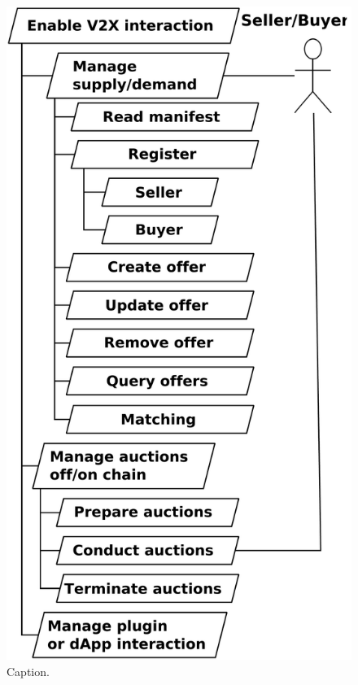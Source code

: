 \documentclass{llncs}
\begin{document}
{				\begin{figure}[H]
					\centering
					\includegraphics[scale=0.175]{Figures/aom/20180501_goal-model--refined-2.pdf}
					\caption{Caption.}	
					\label{fig:refined-aom-goal-model-2}
				\end{figure}				
	
}
\end{document}
